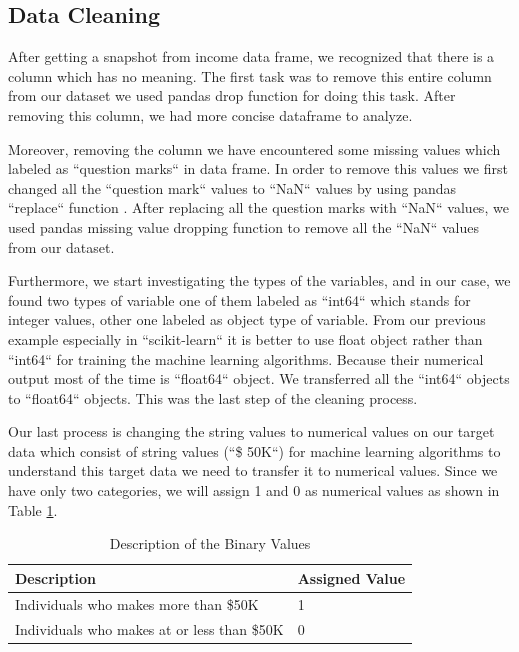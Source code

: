\documentclass[sigconf]{acmart}
\begin{document}
\subsection{Data Cleaning}

After getting a snapshot from income data frame, we recognized that there is a column which has no meaning. The first task was to remove this entire column from our dataset we used pandas drop function for doing this task. After removing this column, we had more concise dataframe to analyze. 

\par Moreover, removing the column we have encountered some missing values which labeled as ``question marks`` in data frame. In order to remove this values we first changed all the ``question mark`` values to ``NaN`` values by using pandas ``replace`` function \cite{www-pandas.replace}. After replacing all the question marks with ``NaN`` values, we used pandas missing value dropping function to remove all the ``NaN`` values from our dataset. 

\par Furthermore, we start investigating the types of the variables, and  in our case, we found two types of variable one of them labeled as ``int64`` which stands for integer values, other one labeled as object type of variable. From our previous example especially in ``scikit-learn`` it is better to use float object rather than ``int64`` for training the machine learning algorithms. Because their numerical output most of the time is ``float64`` object. We transferred all the ``int64`` objects to ``float64`` objects. This was the last step of the cleaning process. 

\par Our last process is changing the string values to numerical values on our target data which consist of string values (``\$ 50K``) for machine learning algorithms to understand this target data we need to transfer it to numerical values. Since we have only two categories, we will assign 1 and 0 as numerical values as shown in Table \ref{assign-values}. 

\begin{table}[!ht]
\centering
\begin{tabular}{|l|l|}
\hline
Description                                 & Assigned Value \\ \hline
Individuals who makes more than \$50K       & 1              \\ \hline
Individuals who makes at or less than \$50K & 0              \\ \hline
\end{tabular}
\caption{Description of the Binary Values}
\label{assign-values}
\end{table}
\end{document}
